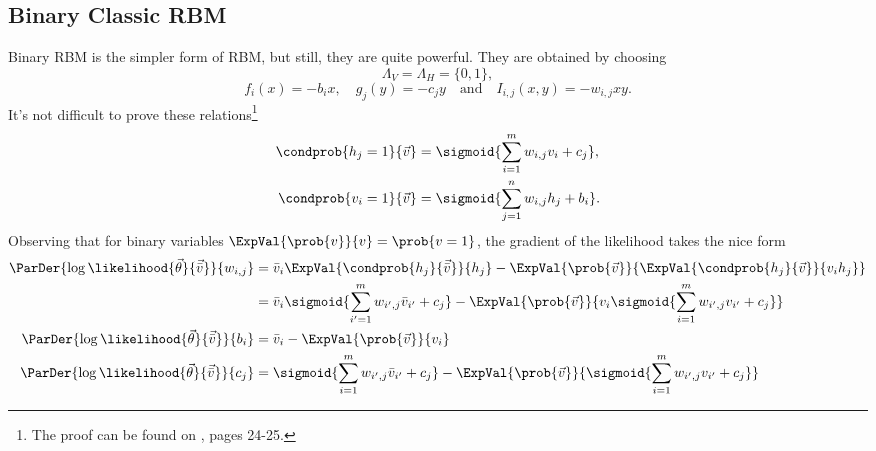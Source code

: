   \subsection{Binary Classic RBM} \label{subsec:binary-classic-RBM}
  Binary RBM is the simpler form of RBM, but still, they are quite powerful.
  They are obtained by choosing
  \[\Lambda_V = \Lambda_H = \{0,1\},\]
  \[
    f_i(x) = -b_ix, \quad g_j(y) = -c_jy  \quad\text{and}\quad I_{i,j}(x,y)=-w_{i,j}xy.
  \]
  It's not difficult to prove these relations\footnote{The proof can be found on
  \cite{fischer2012introduction}, pages 24-25.}
  \begin{align}
    \label{eq:prob-one-hidden-given-visible}
    \condprob{h_j=1}{\vec{v}} &= \sigmoid{\sum_{i=1}^m w_{i,j}v_i+c_j},\\
    \label{eq:prob-one-visible-given-hidden}
    \condprob{v_i=1}{\vec{v}} &= \sigmoid{\sum_{j=1}^n w_{i,j}h_j+b_i}.
  \end{align}
  Observing that for binary variables \(\ExpVal{\prob{v}}{v} = \prob{v=1}\), the gradient of
  the likelihood takes the nice form
  \begin{align}
    \nonumber
    \ParDer{\log\likelihood{\vec{\theta}}{\vec{\bar{v}}}}{w_{i,j}}
      &= \bar{v}_i\ExpVal{\condprob{h_j}{\vec{\bar{v}}}}{h_j} 
         -\ExpVal{\prob{\vec{v}}}{\ExpVal{\condprob{h_j}{\vec{v}}}{v_ih_j}} \\
      \label{eq:logL-gradient-w-RBM}
      &= \bar{v}_i \sigmoid{\sum_{i'=1}^m w_{i',j}\bar{v}_{i'}+c_j}
         -\ExpVal{\prob{\vec{v}}}{v_i \sigmoid{\sum_{i=1}^m w_{i',j}v_{i'}+c_j}} \\
    \ParDer{\log\likelihood{\vec{\theta}}{\vec{\bar{v}}}}{b_i}
      &= \bar{v}_i -\ExpVal{\prob{\vec{v}}}{v_i} \\
    \ParDer{\log\likelihood{\vec{\theta}}{\vec{\bar{v}}}}{c_j}
      &= \sigmoid{\sum_{i=1}^m w_{i',j}\bar{v}_{i'}+c_j}
         -\ExpVal{\prob{\vec{v}}}{\sigmoid{\sum_{i=1}^m w_{i',j}v_{i'}+c_j}}
  \end{align}
